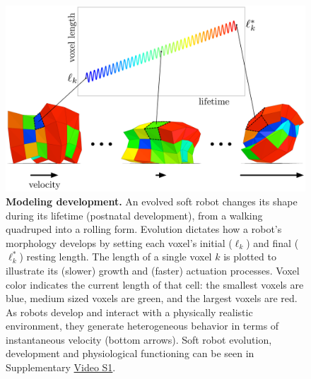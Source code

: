 



\begin{figure}
\centering
\includegraphics[width=0.8\linewidth]{Fig1}
\caption{\label{fig:blueprint}\textbf{Modeling development.} An evolved soft robot changes its shape during its lifetime (postnatal development), from a walking quadruped into a rolling form. 
Evolution dictates how a robot's morphology develops by setting each voxel's initial ($\ell_k$) and final ($\ell^*_k$) resting length.
The length of a single voxel $k$ is plotted to illustrate its (slower) growth and (faster) actuation processes.
Voxel color indicates the current length of that cell: the smallest voxels are blue, medium sized voxels are green, and the largest voxels are red.
As robots develop and interact with a physically realistic environment, they generate heterogeneous behavior in terms of instantaneous velocity (bottom arrows).
Soft robot evolution, development and physiological functioning can be seen in Supplementary \href{https://youtu.be/Ee2sU-AZWC4}{Video S1}.
}
\end{figure}

